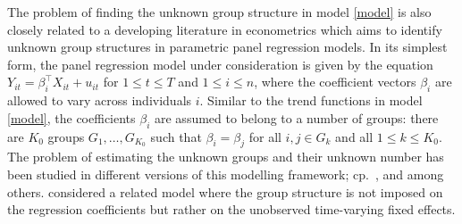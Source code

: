 \documentclass[a4paper,12pt]{article}
\begin{document}
The problem of finding the unknown group structure in model \eqref{model} is also closely related to a developing literature in econometrics which aims to identify unknown group structures in parametric panel regression models. In its simplest form, the panel regression model under consideration is given by the equation $Y_{it} = \beta_i^\top X_{it} + u_{it}$ for $1 \le t \le T$ and $1 \le i \le n$, where the coefficient vectors $\beta_i$ are allowed to vary across individuals $i$. Similar to the trend functions in model \eqref{model}, the coefficients $\beta_i$ are assumed to belong to a number of groups: there are $K_0$ groups $G_1,\ldots,G_{K_0}$ such that $\beta_i = \beta_j$ for all $i,j \in G_k$ and all $1\le k \le K_0$. The problem of estimating the unknown groups and their unknown number has been studied in different versions of this modelling framework; cp.\ \cite{Su2016}, \cite{Su2018} and \cite{Wang2018} among others. \cite{Bonhomme2015} considered a related model where the group structure is not imposed on the regression coefficients but rather on the unobserved time-varying fixed effects. 


\end{document}
